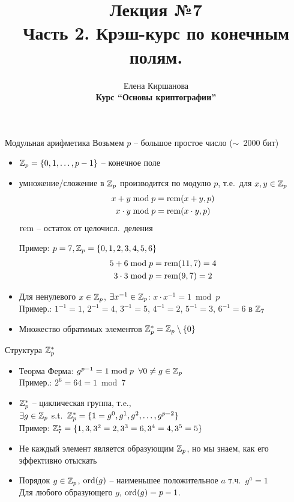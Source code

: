 \documentclass[usenames,dvipsnames,8pt,aspectratio=169]{beamer}
\title{Лекция №7 \\[10pt]
	Часть 2. Крэш-курс по конечным полям.}
\date{ Елена Киршанова \\  \textbf{Курс ``Основы криптографии''} \\  }
\begin{document}
	
\begin{frame}
	\titlepage
\end{frame}



\begin{frame}{Модульная арифметика}
	\Large 
	{\color{Orange} Возьмем $p$ -- большое простое число ($\sim$\ 2000 бит)}
	\begin{itemize}
		\item ${{\mathbb Z}}_p = \left\{ 0, 1, \ldots, p-1 \right\}$ -- конечное поле
		\item умножение/сложение в ${{\mathbb Z}}_p$ производится по модулю $p$, т.е.\ для $x, y \in {{\mathbb Z}}_p$
	\begin{align*}
			x+y \bmod p &= \mathrm{rem}(x+y, p) \\
			x\cdot y \bmod p &= \mathrm{rem}(x\cdot y, p)
	\end{align*}
	{\hspace{90pt} \large $\mathrm{rem} $ -- остаток от целочисл.\ деления}\\[10pt]
	\pause
	
	Пример: $p  = 7, {{\mathbb Z}}_p = \{0, 1, 2, 3, 4, 5, 6\}$
	\begin{align*}
	5+6 \bmod p &= \mathrm{rem}(11, 7) = 4 \\
	3\cdot 3  \bmod p &= \mathrm{rem}(9, 7) = 2
	\end{align*}
	\pause
	\item Для ненулевого $x \in {{\mathbb Z}}_p$, $\exists x^{-1} \in {{\mathbb Z}}_p$: $x \cdot x^{-1} = 1 \bmod p$\\
	Пример.:  $1^{-1} = 1$, $2^{-1} = 4$, $3^{-1} = 5$,  $4^{-1} = 2$, $5^{-1} = 3$, $6^{-1} = 6$ в ${{\mathbb Z}}_7$
	\item Множество обратимых элементов ${{\mathbb Z}}_p^{\ast} = {{\mathbb Z}}_p \setminus \{0\}$
	\end{itemize}

\end{frame}

\begin{frame}{Структура ${{\mathbb Z}}_p^\ast$ }
\Large
\begin{itemize}
	\itemsep 10pt
	\item {\color{Orange} Теорма Ферма:} $g^{p-1} = 1 \bmod p \; \; \forall 0 \neq g \in {{\mathbb Z}}_p$\\[5pt]
	Пример.: $2^6 = 64 = 1 \bmod 7$
	\item ${{\mathbb Z}}_p^\ast$ --  {\color{Orange} циклическая группа}, т.e., \\
	$\exists g \in {{\mathbb Z}}_p$ s.t.\ ${{\mathbb Z}}_p^\ast = \{1 = g^0, g^1, g^2, \ldots, g^{p-2}\}$ \\[5pt]
	Пример: ${{\mathbb Z}}_7^\ast = \{1, 3, 3^2 = 2, 3^3 = 6, 3^4 = 4, 3^5 = 5\}$ 

	\item Не каждый элемент является образующим  ${{\mathbb Z}}_p$, но мы знаем, как его эффективно отыскать

	\item {\color{Orange} Порядок} $g \in {{\mathbb Z}}_p$, $\mathrm{ord}(g)$ -- {\color{Orange} наименьшее} положительное $a$ т.ч.\ $g^a = 1$ \\[5pt]
	Для любого образующего $g$, $\mathrm{ord}(g) = p-1$.
\end{itemize}
\end{frame}
\end{document}
